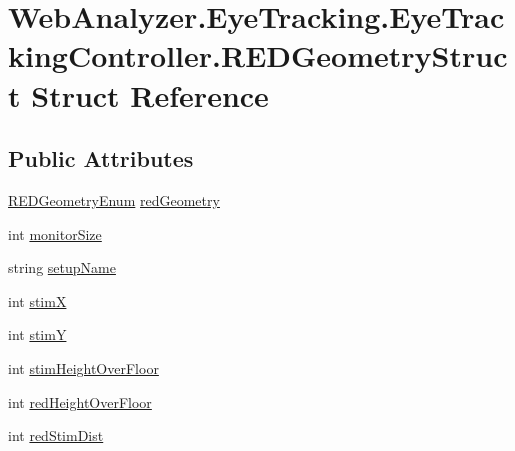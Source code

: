 \hypertarget{struct_web_analyzer_1_1_eye_tracking_1_1_eye_tracking_controller_1_1_r_e_d_geometry_struct}{}\section{Web\+Analyzer.\+Eye\+Tracking.\+Eye\+Tracking\+Controller.\+R\+E\+D\+Geometry\+Struct Struct Reference}
\label{struct_web_analyzer_1_1_eye_tracking_1_1_eye_tracking_controller_1_1_r_e_d_geometry_struct}
\subsection*{Public Attributes}
\begin{DoxyCompactItemize}
\item 
\hyperlink{class_web_analyzer_1_1_eye_tracking_1_1_eye_tracking_controller_a25a4e64fbf5eeef1ac03e2366003b3c7}{R\+E\+D\+Geometry\+Enum} \hyperlink{struct_web_analyzer_1_1_eye_tracking_1_1_eye_tracking_controller_1_1_r_e_d_geometry_struct_ae327f2e8a685f386458055047e083352}{red\+Geometry}
\item 
int \hyperlink{struct_web_analyzer_1_1_eye_tracking_1_1_eye_tracking_controller_1_1_r_e_d_geometry_struct_a61e14d0fafb158a19d005e1d3b64d8e6}{monitor\+Size}
\item 
string \hyperlink{struct_web_analyzer_1_1_eye_tracking_1_1_eye_tracking_controller_1_1_r_e_d_geometry_struct_aea7415cc01cf8d3f30405978ac435597}{setup\+Name}
\item 
int \hyperlink{struct_web_analyzer_1_1_eye_tracking_1_1_eye_tracking_controller_1_1_r_e_d_geometry_struct_a86e45f07f55aed6c82044031788c84c2}{stim\+X}
\item 
int \hyperlink{struct_web_analyzer_1_1_eye_tracking_1_1_eye_tracking_controller_1_1_r_e_d_geometry_struct_a225b3c6bba3ca69b310869159ade4fbe}{stim\+Y}
\item 
int \hyperlink{struct_web_analyzer_1_1_eye_tracking_1_1_eye_tracking_controller_1_1_r_e_d_geometry_struct_a3bcd82d3fc43351e98d61abfa50abb60}{stim\+Height\+Over\+Floor}
\item 
int \hyperlink{struct_web_analyzer_1_1_eye_tracking_1_1_eye_tracking_controller_1_1_r_e_d_geometry_struct_ae737a677a07a56337fe9abeb0afabc60}{red\+Height\+Over\+Floor}
\item 
int \hyperlink{struct_web_analyzer_1_1_eye_tracking_1_1_eye_tracking_controller_1_1_r_e_d_geometry_struct_a4b430e8ae8c90875625ac7dccbd79bce}{red\+Stim\+Dist}

\end{DoxyCompactItemize}

